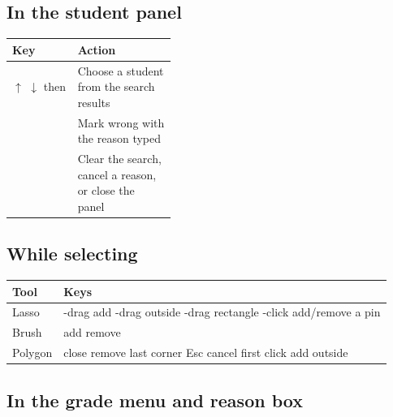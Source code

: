 \begin{multicols}{2}
\subsection{In the student panel}\label{sec:shortcuts:in-the-student-panel}

\begingroup\renewcommand{\arraystretch}{1.35}
\noindent\begin{tabularx}{\linewidth}{>{\raggedright\arraybackslash}p{0.4\linewidth}Y}
\toprule
\textbf{Key} & \textbf{Action} \\
\midrule
\ensuremath{\uparrow} \ensuremath{\downarrow} then \returnsym{} & Choose a student from the search results \\
\keycap{\returnsym{}} & Mark wrong with the reason typed \\
 & Clear the search, cancel a reason, or close the panel \\
\bottomrule
\end{tabularx}\endgroup\par\medskip

\subsection{While selecting}\label{sec:shortcuts:while-selecting}

\begingroup\renewcommand{\arraystretch}{1.35}
\noindent\begin{tabularx}{\linewidth}{YY}
\toprule
\textbf{Tool} & \textbf{Keys} \\
\midrule
Lasso & \cmdsym{}-drag add \textperiodcentered{} \shiftsym{}-drag outside \textperiodcentered{} \optsym{}-drag rectangle \textperiodcentered{} \cmdsym{}-click add/remove a pin \\
Brush & \shiftsym{} add \textperiodcentered{} \optsym{} remove \\
Polygon & \returnsym{} close \textperiodcentered{} \deletesym{} remove last corner \textperiodcentered{} Esc cancel \textperiodcentered{} \cmdsym{} first click add \textperiodcentered{} \shiftsym{} outside \\
\bottomrule
\end{tabularx}\endgroup\par\medskip

\subsection{In the grade menu and reason box}\label{sec:shortcuts:in-the-grade-menu-and-reason-box}


\end{multicols}
